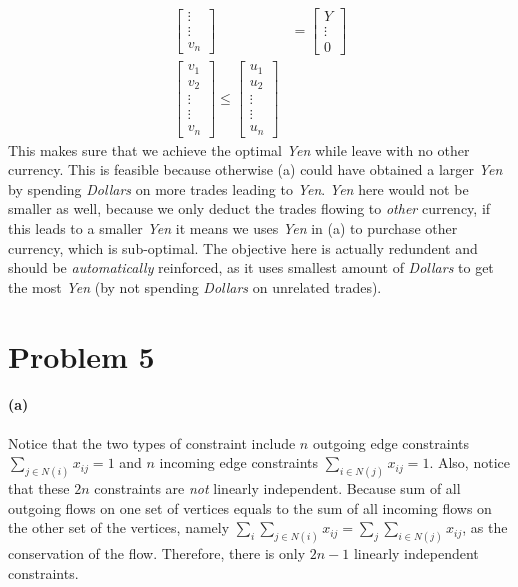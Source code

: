 \documentclass[12pt]{article}
\begin{document}
\begin{align*}
\begin{bmatrix}
\vdots\\
\vdots\\
v_n
\end{bmatrix} &=
\begin{bmatrix}
Y\\
\vdots\\
0
\end{bmatrix} \\
\begin{bmatrix}
v_1\\
v_2\\
\vdots\\
\vdots\\
v_n
\end{bmatrix}  \leq 
\begin{bmatrix}
u_1\\
u_2\\
\vdots\\
\vdots\\
u_n
\end{bmatrix} &
\end{align*}
This makes sure that we achieve the optimal \emph{Yen} while leave with no other currency. This is feasible because otherwise (a) could have obtained a larger \emph{Yen} by spending \emph{Dollars} on more trades leading to \emph{Yen}. \emph{Yen} here would not be smaller as well, because we only deduct the trades flowing to \emph{other} currency, if this leads to a smaller \emph{Yen} it means we uses \emph{Yen} in (a) to purchase other currency, which is sub-optimal. The objective here is actually redundent and should be \emph{automatically} reinforced, as it uses smallest amount of \emph{Dollars} to get the most \emph{Yen} (by not spending \emph{Dollars} on unrelated trades). 

\section*{Problem 5}
\paragraph{(a)} Notice that the two types of constraint include $n$ outgoing edge constraints $\sum_{j\in N(i)}x_{ij} = 1$ and $n$ incoming edge constraints $\sum_{i\in N(j)}x_{ij} = 1$. Also, notice that these $2n$ constraints are \emph{not} linearly independent. Because sum of all outgoing flows on one set of vertices equals to the sum of all incoming flows on the other set of the vertices, namely $\sum_i\sum_{j\in N(i)}x_{ij} = \sum_j\sum_{i\in N(j)}x_{ij}$, as the conservation of the flow. Therefore, there is only $2n-1$ linearly independent constraints. 
\end{document}

